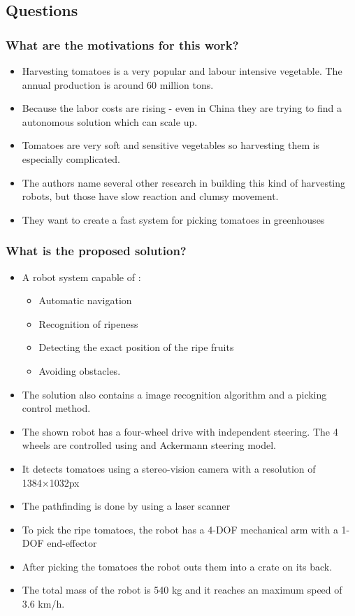 \documentclass{article}
\begin{document}
\subsection*{Questions}

\subsubsection*{What are the motivations for this work?}
\begin{itemize}
    \item Harvesting tomatoes is a very popular and labour intensive vegetable. The annual production is around 60 million tons. 
    \item Because the labor costs are rising - even in China they are trying to find a autonomous solution which can scale up.
    \item Tomatoes are very soft and sensitive vegetables so harvesting them is especially complicated.
    \item The authors name several other research in building this kind of harvesting robots, but those have slow reaction and clumsy movement. 
    \item They want to create a fast system for picking tomatoes in greenhouses
\end{itemize}
\subsubsection*{What is the proposed solution?} 
\begin{itemize}
    \item A robot system capable of : \begin{itemize}
        \item Automatic navigation
        \item Recognition of ripeness
        \item Detecting the exact position of the ripe fruits
        \item Avoiding obstacles.
    \end{itemize}
    \item The solution also contains a image recognition algorithm and a picking control method.
    \item The shown robot has a four-wheel drive with independent steering. The 4 wheels are controlled using and Ackermann steering model.
    \item It detects tomatoes using a stereo-vision camera with a resolution of 1384×1032px
    \item The pathfinding is done by using a laser scanner
    \item To pick the ripe tomatoes, the robot has a 4-DOF mechanical arm with a 1-DOF end-effector 
    \item After picking the tomatoes the robot outs them into a crate on its back.
    \item The total mass of the robot is 540 kg and it reaches an maximum speed of 3.6 km/h.
\end{itemize}
\end{document}
